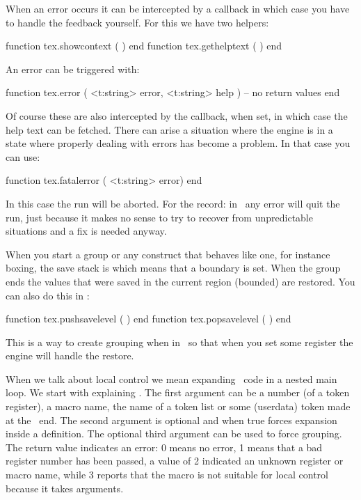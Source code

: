 When an error occurs it can be intercepted by a callback in which case you have
to handle the feedback yourself. For this we have two helpers:

\starttyping[option=LUA]
function tex.showcontext ( ) end
function tex.gethelptext ( ) end
\stoptyping

An error can be triggered with:

\starttyping[option=LUA]
function tex.error (
    <t:string> error,
    <t:string> help
)
    -- no return values
end
\stoptyping

Of course these are also intercepted by the callback, when set, in which case the
help text can be fetched. There can arise a situation where the engine is in a
state where properly dealing with errors has become a problem. In that case you
can use:

\starttyping[option=LUA]
function tex.fatalerror ( <t:string> error) end
\stoptyping

In this case the run will be aborted. For the record: in \CONTEXT\ any error will
quit the run, just because it makes no sense to try to recover from unpredictable
situations and a fix is needed anyway.

\stopsubsection

\startsubsection[title=Save levels]

When you start a group or any construct that behaves like one, for instance
boxing, the save stack is  which means that a boundary is set.
When the group ends the values that were saved in the current region (bounded)
are restored. You can also do this in \LUA:

\starttyping[option=LUA]
function tex.pushsavelevel ( ) end
function tex.popsavelevel  ( ) end
\stoptyping

This is a way to create grouping when in \LUA\ so that when you set some register
the engine will handle the restore.

\stopsubsection

\startsubsection[title=Local control]

When we talk about local control we mean expanding \TEX\ code in a nested main
loop. We start with explaining . The first argument can be a
number (of a token register), a macro name, the name of a token list or some
(userdata) token made at the \LUA\ end. The second argument is optional and when
true forces expansion inside a definition. The optional third argument can be
used to force grouping. The return value indicates an error: 0 means no error, 1
means that a bad register number has been passed, a value of 2 indicated an
unknown register or macro name, while 3 reports that the macro is not suitable
for local control because it takes arguments.

